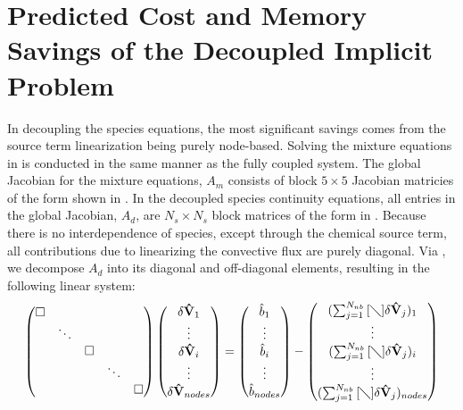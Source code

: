 \section{Predicted Cost and Memory Savings of the Decoupled Implicit Problem}
\label{sec:predicted-cost-mem-savings}

In decoupling the species equations, the most significant savings comes from the
source term linearization being purely node-based\cite{gnoffo-tp}.  Solving the
mixture equations in is conducted in the same manner as the fully coupled
system.  The global Jacobian for the mixture equations, $A_m$ consists of block
$5 \times 5$ Jacobian matricies of the form shown in . In the
decoupled species continuity equations, all entries in the global Jacobian,
$A_d$, are $N_s \times N_s$ block matrices of the form in .
Because there is no interdependence of species, except through the chemical
source term, all contributions due to linearizing the convective flux are purely
diagonal.  Via , we decompose $A_d$ into its diagonal and
off-diagonal elements, resulting in the following linear system:
\begin{equation}
  \label{dc_sys} 
  \begin{pmatrix} 
    \Box & & & & \\ & \ddots & & & \\ & & \Box \\ & & & \ddots & \\ & & & & \Box
  \end{pmatrix}
  \begin{pmatrix}
    \delta \mathbf{\hat{V}}_1 \\ \vdots \\ \delta \mathbf{\hat{V}}_i \\ 
    \vdots \\ \delta \mathbf{\hat{V}}_{nodes}
  \end{pmatrix}
  =
  \begin{pmatrix}
    \hat{b}_1 \\ \vdots \\ \hat{b}_i \\ \vdots \\ \hat{b}_{nodes} 
  \end{pmatrix}
  -
  \begin{pmatrix}
    (\sum_{j=1}^{N_{nb}}{[\diagdown] \delta\mathbf{\hat{V}}_{j}})_1 \\ \vdots \\
    (\sum_{j=1}^{N_{nb}}{[\diagdown] \delta\mathbf{\hat{V}}_{j}})_i \\ \vdots \\
    (\sum_{j=1}^{N_{nb}}{[\diagdown] \delta\mathbf{\hat{V}}_{j}})_{nodes}
  \end{pmatrix} 
\end{equation} 
